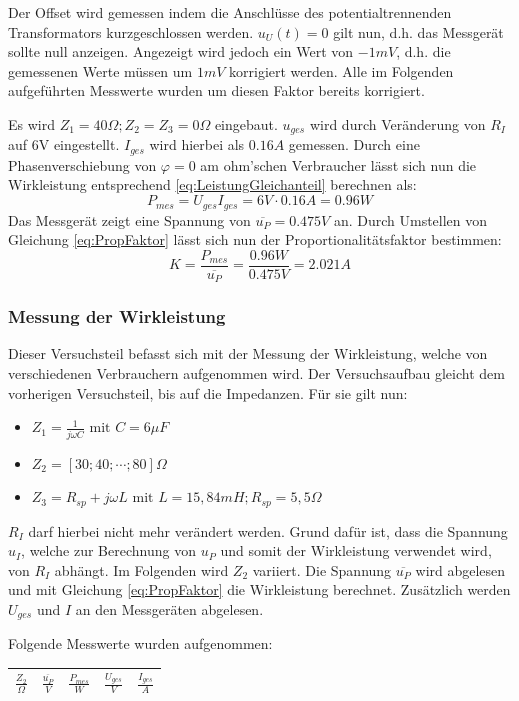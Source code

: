 Der Offset wird gemessen indem die Anschlüsse des potentialtrennenden Transformators kurzgeschlossen werden. $u_U(t)=0$ gilt nun, d.h. das Messgerät sollte null anzeigen.
Angezeigt wird jedoch ein Wert von $-1mV$, d.h. die gemessenen Werte müssen um $1mV$ korrigiert werden. Alle im Folgenden aufgeführten Messwerte wurden um diesen Faktor bereits korrigiert.

Es wird $Z_1 = 40\Omega; Z_2 = Z_3 = 0\Omega$ eingebaut. $u_{ges}$ wird durch Veränderung von $R_I$ auf 6V eingestellt. $I_{ges}$ wird hierbei als $0.16A$ gemessen. Durch eine Phasenverschiebung von $\varphi = 0$ am ohm'schen Verbraucher lässt sich nun die Wirkleistung entsprechend \eqref{eq:LeistungGleichanteil} berechnen als:
\begin{equation*}
P_{mes}=U_{ges}I_{ges} = 6V\cdot 0.16A = 0.96W
\end{equation*}
Das Messgerät zeigt eine Spannung von $\overline{u_P}=0.475V$ an. 
Durch Umstellen von Gleichung \eqref{eq:PropFaktor} lässt sich nun der Proportionalitätsfaktor bestimmen:
\begin{equation*}
K=\frac{P_{mes}}{\overline{u_P}} = \frac{0.96W}{0.475V} = 2.021A
\end{equation*}

\subsubsection{Messung der Wirkleistung}

Dieser Versuchsteil befasst sich mit der Messung der Wirkleistung, welche von verschiedenen Verbrauchern aufgenommen wird. Der Versuchsaufbau gleicht dem vorherigen Versuchsteil, bis auf die Impedanzen. Für sie gilt nun:
\begin{itemize}
\item $Z_1 = \frac{1}{j\omega C} \mbox{ mit } C = 6\mu F$
\item $Z_2 = [30; 40; \cdots; 80]\Omega$
\item $Z_3 = R_{sp} + j\omega L \mbox{ mit } L = 15,84mH; R_{sp} = 5,5\Omega$
\end{itemize}
$R_I$ darf hierbei nicht mehr verändert werden. Grund dafür ist, dass die Spannung $u_I$, welche zur Berechnung von $u_P$ und somit der Wirkleistung verwendet wird, von $R_I$ abhängt.
Im Folgenden wird $Z_2$ variiert. Die Spannung $\overline{u_P}$ wird abgelesen und mit Gleichung \eqref{eq:PropFaktor} die Wirkleistung berechnet. Zusätzlich werden $U_{ges}$ und $I$ an den Messgeräten abgelesen.

Folgende Messwerte wurden aufgenommen:

\begin{center}
\begin{tabular}{| c | c | c | c | c |}
\hline
$\frac{Z_2}{\Omega}$ & $\frac{\overline{u_P}}{V}$ & $\frac{P_{mes}}{W}$ & $\frac{U_{ges}}{V}$ & $\frac{I_{ges}}{A}$ \\
\hline
\end{tabular}
\end{center}